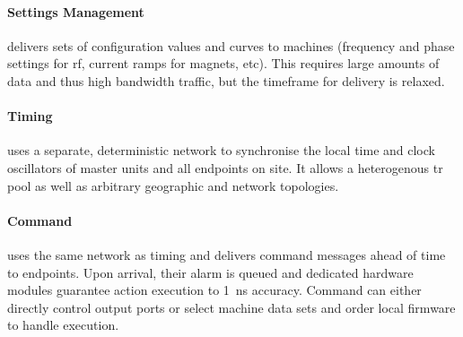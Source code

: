 \paragraph{Settings Management} delivers sets of configuration values and curves to machines (frequency and phase settings for \gls{rf}, current ramps for magnets, etc). This requires large amounts of data and thus high bandwidth traffic, but the timeframe for delivery is relaxed. 
\paragraph{Timing} uses a separate, deterministic network to synchronise the local time and clock oscillators of master units and all endpoints on site. It allows a heterogenous \gls{tr} pool as well as arbitrary geographic and network topologies.
\paragraph{Command} uses the same network as timing and delivers command messages ahead of time to endpoints. Upon arrival, their alarm is queued and dedicated hardware modules guarantee action execution to \SI{1}{\nano\second} accuracy. Command can either directly control output ports or select machine data sets and order local firmware to handle execution.
\vspace{-1cm}
